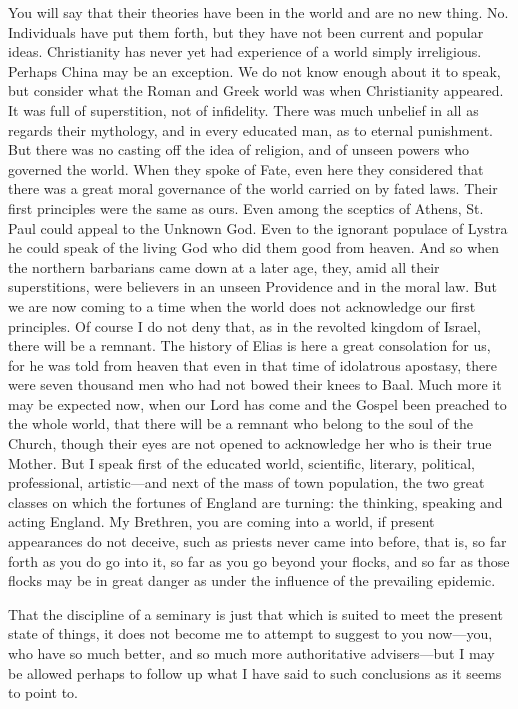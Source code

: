 You will say that their theories have been in the
world and are no new thing. No. Individuals have put them forth, but
they have not been current and popular ideas. Christianity has never
yet had experience of a world simply irreligious. Perhaps China
may be an exception. We do not know enough about it to speak, but
consider what the Roman and Greek world was when Christianity
appeared. It was full of superstition, not of infidelity. There was
much unbelief in all as regards their mythology, and in every educated
man, as to eternal punishment. But there was no casting off the idea
of religion, and of unseen powers who governed the world. When they
spoke of Fate, even here they considered that there was a great moral
governance of the world carried on by fated laws. Their first
principles were the same as ours. Even among the sceptics of Athens,
St. Paul could appeal to the Unknown God. Even to the ignorant
populace of Lystra he could speak of the living God who did them good
from heaven. And so when the northern barbarians came down at a later
age, they, amid all their superstitions, were believers in an unseen
Providence and in the moral law. But we are now coming to a time when
the world does not acknowledge our first principles. Of course I do
not deny that, as in the revolted kingdom of Israel, there will be a
remnant. The history of Elias is here a great consolation for us, for
he was told from heaven that even in that time of idolatrous apostasy,
there were seven thousand men who had not bowed their knees to Baal.
Much more it may be expected now, when our Lord has come and the
Gospel been preached to the whole world, that there will be a remnant
who belong to the soul of the Church, though their eyes are not opened
to acknowledge her who is their true Mother. But I speak first
of the educated world, scientific, literary, political, professional,
artistic—and next of the mass of town population, the two great
classes on which the fortunes of England are turning: the thinking,
speaking and acting England. My Brethren, you are coming into a world,
if present appearances do not deceive, such as priests never came into
before, that is, so far forth as you do go into it, so far as you go
beyond your flocks, and so far as those flocks may be in great danger
as under the influence of the prevailing epidemic.

That the discipline of a seminary is just that
which is suited to meet the present state of things, it does not
become me to attempt to suggest to you now—you, who have so much
better, and so much more authoritative advisers—but I may be allowed
perhaps to follow up what I have said to such conclusions as it seems
to point to.

